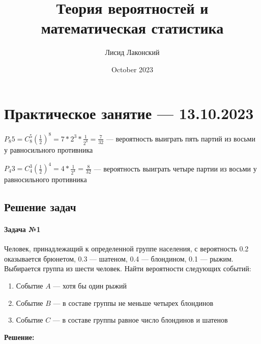 \documentclass{article}
\title{Теория вероятностей и математическая статистика}
\author{Лисид Лаконский}
\date{October 2023}
\begin{document}
\raggedright

\maketitle

\tableofcontents
\pagebreak

\section{Практическое занятие — 13.10.2023}

$P_{8}{5} = C_{8}^{5} (\frac{1}{2})^8 = 7 * 2^3 * \frac{1}{2^{8}} = \frac{7}{32}$ — вероятность выиграть пять партий из восьми у равносильного противника

$P_{4}{3} = C_{4}^{3} (\frac{1}{2})^4 = 4 * \frac{1}{2^{4}} = \frac{8}{32}$ — вероятность выиграть четыре партии из восьми у равносильного противника

\subsection{Решение задач}

\paragraph{Задача №1}

Человек, принадлежащий к определенной группе населения, с вероятность 0.2 оказывается брюнетом, 0.3 — шатеном, 0.4 — блондином, 0.1 — рыжим. Выбирается группа из шести человек. Найти вероятности следующих событий:

\begin{enumerate}
    \item Событие $A$ — хотя бы один рыжий
    \item Событие $B$ — в составе группы не меньше четырех блондинов
    \item Событие $C$ — в составе группы равное число блондинов и шатенов
\end{enumerate}

\textbf{Решение:}
\end{document}
